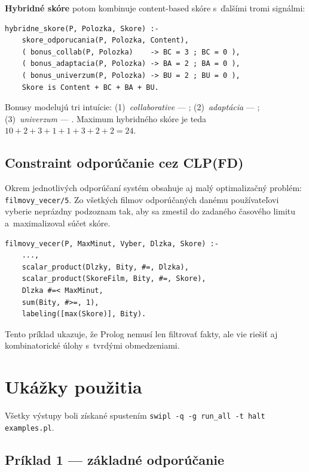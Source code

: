 \documentclass[11pt,a4paper]{article}
\begin{document}
\noindent
\textbf{Hybridné skóre} potom kombinuje content-based skóre
s~ďalšími tromi signálmi:

\begin{lstlisting}
hybridne_skore(P, Polozka, Skore) :-
    skore_odporucania(P, Polozka, Content),
    ( bonus_collab(P, Polozka)    -> BC = 3 ; BC = 0 ),
    ( bonus_adaptacia(P, Polozka) -> BA = 2 ; BA = 0 ),
    ( bonus_univerzum(P, Polozka) -> BU = 2 ; BU = 0 ),
    Skore is Content + BC + BA + BU.
\end{lstlisting}

\noindent
Bonusy modelujú tri intuície: (1)~\emph{collaborative} ---
; (2)~\emph{adaptácia}
--- ; (3)~\emph{univerzum}
--- . Maximum
hybridného skóre je teda~$10 + 2 + 3 + 1 + 1 + 3 + 2 + 2 = 24$.

\subsection{Constraint odporúčanie cez CLP(FD)}

Okrem jednotlivých odporúčaní systém obsahuje aj malý optimalizačný
problém: \texttt{filmovy\_vecer/5}. Zo všetkých filmov odporúčaných
danému používateľovi vyberie neprázdny podzoznam tak, aby sa zmestil
do zadaného časového limitu a~maximalizoval súčet skóre.

\begin{lstlisting}
filmovy_vecer(P, MaxMinut, Vyber, Dlzka, Skore) :-
    ...,
    scalar_product(Dlzky, Bity, #=, Dlzka),
    scalar_product(SkoreFilm, Bity, #=, Skore),
    Dlzka #=< MaxMinut,
    sum(Bity, #>=, 1),
    labeling([max(Skore)], Bity).
\end{lstlisting}

\noindent
Tento príklad ukazuje, že Prolog nemusí len filtrovať fakty, ale
vie riešiť aj kombinatorické úlohy s~tvrdými obmedzeniami.

\section{Ukážky použitia}

Všetky výstupy boli získané spustením
\texttt{swipl -q -g run\_all -t halt examples.pl}.

\subsection{Príklad 1 --- základné odporúčanie}
\end{document}
